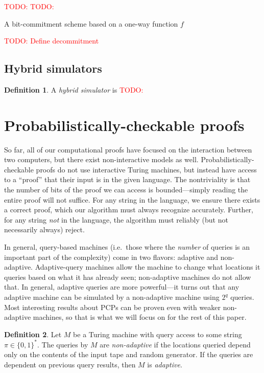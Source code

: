 \documentclass[english,12pt]{reedthesis}
\theoremstyle{plain}
\theoremstyle{definition}
\newtheorem{defn}[defn]{Definition}
\theoremstyle{remark}
\newcommand{\TODO}[1]{\textcolor{red}{TODO: #1}}
\begin{document}
\begin{algorithm}[htbp]
  \TODO{}\;
  \TODO{}\;
  \caption{A bit-commitment scheme based on a one-way function
    $f$}\label{alg:bit-commit}
\end{algorithm}

\TODO{Define decommitment}

\subsection{Hybrid simulators}\label{sec:hybrid-sim}

\begin{defn}\label{def:hybrid-sim}
  A \emph{hybrid simulator} is \TODO{}
\end{defn}

\section{Probabilistically-checkable proofs}\label{sec:pcp}

So far, all of our computational proofs have focused on the interaction between
two computers, but there exist non-interactive models as well.
Probabilistically-checkable proofs do not use interactive Turing machines, but
instead have access to a ``proof'' that their input is in the given language.
The nontriviality is that the number of bits of the proof we can access is
bounded---simply reading the entire proof will not suffice. For any string in the
language, we ensure there exists a correct proof, which our algorithm must
always recognize accurately. Further, for any string \emph{not} in the language,
the algorithm must reliably (but not necessarily always) reject.

In general, query-based machines (i.e.\ those where the \emph{number} of queries
is an important part of the complexity) come in two flavors: adaptive and
non-adaptive. Adaptive-query machines allow the machine to change what locations
it queries based on what it has already seen; non-adaptive machines do not allow
that. In general, adaptive queries are more powerful---it turns out that any
adaptive machine can be simulated by a non-adaptive machine using $2^{q}$
queries. Most interesting results about PCPs can be proven even with weaker
non-adaptive machines, so that is what we will focus on for the rest of this
paper.

\begin{defn}\label{def:adaptive}
  Let $M$ be a Turing machine with query access to some string
  $\pi \in \{0, 1\}^{*}$. The queries by $M$ are \emph{non-adaptive} if the
  locations queried depend only on the contents of the input tape and random
  generator. If the queries are dependent on previous query results, then $M$ is
  \emph{adaptive}.
\end{defn}
\end{document}
